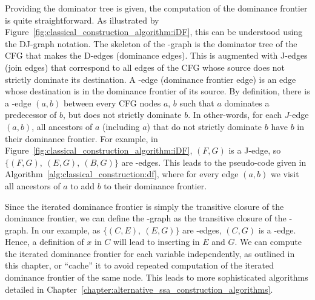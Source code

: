 {Providing the dominator tree is given, the computation of the dominance frontier is quite straightforward. As illustrated by Figure~\ref{fig:classical_construction_algorithm:iDF}, this can be understood using the DJ-graph notation. The skeleton of the \DJ-graph is the dominator tree of the CFG that makes the D-edges (dominance edges). This is augmented with J-edges (join edges) that correspond to all edges of the CFG whose source does not strictly dominate its destination. A \DF-edge (dominance frontier edge) is an edge whose destination is in the dominance frontier of its source. By definition, there is a \DF-edge $(a,b)$ between every CFG nodes $a$, $b$ such that $a$ dominates a predecessor of $b$, but does not strictly dominate $b$. 
In other-words, for each  $J$-edge $(a,b)$, all ancestors of $a$ (including
$a$) that do not strictly dominate $b$ have $b$ in their dominance
frontier. For example, in Figure~\ref{fig:classical_construction_algorithm:iDF}, $(F,G)$ is a J-edge, so $\{(F,G),\ (E,G),\ (B,G)\}$ are \DF-edges. This leads to the pseudo-code given in
Algorithm~\ref{alg:classical_construction:df}, where for every edge $(a,b)$ we visit all ancestors of 
$a$ to add $b$ to their dominance frontier.
 
Since the iterated dominance frontier is simply the transitive closure
of the dominance frontier, we can define the \iDF-graph as the transitive closure of the \DF-graph. In our example, as $\{(C,E),\ (E,G)\}$ are \DF-edges, $(C,G)$ is a \iDF-edge. Hence, a definition of $x$ in $C$ will lead to inserting \phifuns in $E$ and $G$.
We can compute the iterated dominance frontier for each variable independently, as outlined in this chapter, or ``cache'' it to avoid repeated computation of the iterated dominance frontier of the same node. This leads to more sophisticated algorithms detailed in Chapter~\ref{chapter:alternative_ssa_construction_algorithms}.

}
